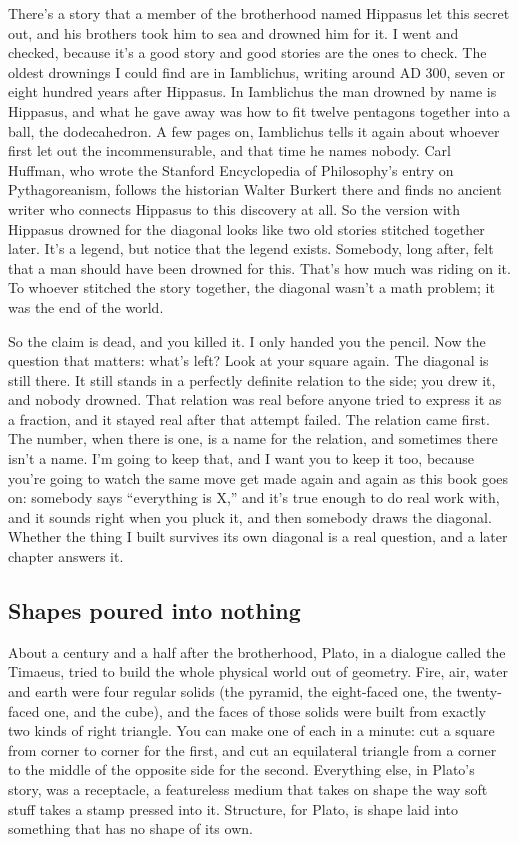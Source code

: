 \documentclass[11pt,twoside]{article}
\theoremstyle{thielethm}
\theoremstyle{thieledef}
\theoremstyle{thieledef}
\theoremstyle{thieledef}
\theoremstyle{thielethm}
\theoremstyle{thieleobs}
\theoremstyle{thielethm}
\begin{document}
There's a story that a member of the brotherhood named Hippasus let this secret out, and his brothers took him to sea and drowned him for it. I went and checked, because it's a good story and good stories are the ones to check. The oldest drownings I could find are in Iamblichus, writing around AD 300, seven or eight hundred years after Hippasus. In Iamblichus the man drowned by name is Hippasus, and what he gave away was how to fit twelve pentagons together into a ball, the dodecahedron. A few pages on, Iamblichus tells it again about whoever first let out the incommensurable, and that time he names nobody. Carl Huffman, who wrote the Stanford Encyclopedia of Philosophy's entry on Pythagoreanism, follows the historian Walter Burkert there and finds no ancient writer who connects Hippasus to this discovery at all. So the version with Hippasus drowned for the diagonal looks like two old stories stitched together later. It's a legend, but notice that the legend exists. Somebody, long after, felt that a man should have been drowned for this. That's how much was riding on it. To whoever stitched the story together, the diagonal wasn't a math problem; it was the end of the world.

So the claim is dead, and you killed it. I only handed you the pencil. Now the question that matters: what's left? Look at your square again. The diagonal is still there. It still stands in a perfectly definite relation to the side; you drew it, and nobody drowned. That relation was real before anyone tried to express it as a fraction, and it stayed real after that attempt failed. The relation came first. The number, when there is one, is a name for the relation, and sometimes there isn't a name. I'm going to keep that, and I want you to keep it too, because you're going to watch the same move get made again and again as this book goes on: somebody says ``everything is X,'' and it's true enough to do real work with, and it sounds right when you pluck it, and then somebody draws the diagonal. Whether the thing I built survives its own diagonal is a real question, and a later chapter answers it.

\subsection{Shapes poured into nothing}

About a century and a half after the brotherhood, Plato, in a dialogue called the Timaeus, tried to build the whole physical world out of geometry. Fire, air, water and earth were four regular solids (the pyramid, the eight-faced one, the twenty- faced one, and the cube), and the faces of those solids were built from exactly two kinds of right triangle. You can make one of each in a minute: cut a square from corner to corner for the first, and cut an equilateral triangle from a corner to the middle of the opposite side for the second. Everything else, in Plato's story, was a receptacle, a featureless medium that takes on shape the way soft stuff takes a stamp pressed into it. Structure, for Plato, is shape laid into something that has no shape of its own.
\end{document}
